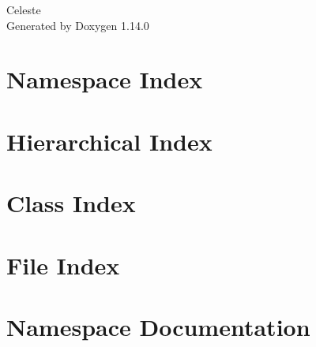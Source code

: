 \documentclass[twoside]{book}
\newcommand{\+}{\discretionary{\mbox{\scriptsize$\hookleftarrow$}}{}{}}
\newcommand{\clearemptydoublepage}{%
    \newpage{\pagestyle{empty}\cleardoublepage}%
  }
\begin{document}
  \raggedbottom
    \hypersetup{pageanchor=false,
                bookmarksnumbered=true,
                pdfencoding=unicode
               }
  \begin{titlepage}
  \vspace*{7cm}
  \begin{center}%
  {\Large Celeste}\\
  \vspace*{1cm}
  {\large Generated by Doxygen 1.14.0}\\
  \end{center}
  \end{titlepage}
  \clearemptydoublepage
  \tableofcontents
  \clearemptydoublepage
  \hypersetup{pageanchor=true}

\chapter{Namespace Index}

\chapter{Hierarchical Index}

\chapter{Class Index}

\chapter{File Index}

\chapter{Namespace Documentation}

\end{document}
